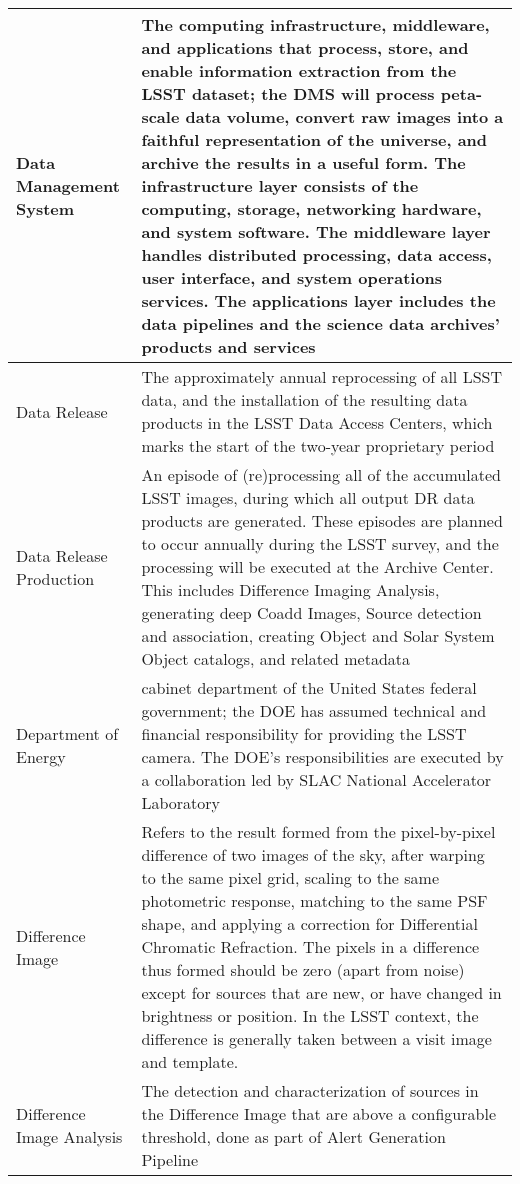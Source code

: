 \begin{longtable}{|p{}|p{}|}
Data Management System & The computing infrastructure, middleware, and applications that process, store, and enable information extraction from the \gls{LSST} dataset; the \gls{DMS} will process peta-scale data volume, convert raw images into a faithful representation of the universe, and archive the results in a useful form. The infrastructure layer consists of the computing, storage, networking hardware, and system software. The middleware layer handles distributed processing, data access, user interface, and system operations services. The applications layer includes the data pipelines and the science data archives' products and services \\\hline
Data Release & The approximately annual reprocessing of all \gls{LSST} data, and the installation of the resulting data products in the \gls{LSST} Data Access Centers, which marks the start of the two-year proprietary period \\\hline
Data Release Production & An episode of (re)processing all of the accumulated \gls{LSST} images, during which all output \gls{DR} data products are generated. These episodes are planned to occur annually during the \gls{LSST} survey, and the processing will be executed at the \gls{Archive Center}. This includes Difference Imaging Analysis, generating deep Coadd Images, \gls{Source} detection and association, creating Object and \gls{Solar System Object} catalogs, and related \gls{metadata} \\\hline
Department of Energy & cabinet department of the United States federal government; the \gls{DOE} has assumed technical and financial responsibility for providing the \gls{LSST} \gls{camera}. The \gls{DOE}'s responsibilities are executed by a collaboration led by \gls{SLAC} National Accelerator Laboratory \\\hline
Difference Image & Refers to the result formed from the pixel-by-pixel difference of two images of the sky, after warping to the same pixel grid, scaling to the same photometric response, matching to the same \gls{PSF} \gls{shape}, and applying a correction for \gls{Differential Chromatic Refraction}. The pixels in a difference thus formed should be zero (apart from noise) except for sources that are new, or have changed in brightness or position. In the \gls{LSST} context, the difference is generally taken between a visit image and template.  \\\hline
Difference Image Analysis & The detection and characterization of sources in the \gls{Difference Image} that are above a configurable threshold, done as part of \gls{Alert} Generation Pipeline \\\hline

\end{longtable}
